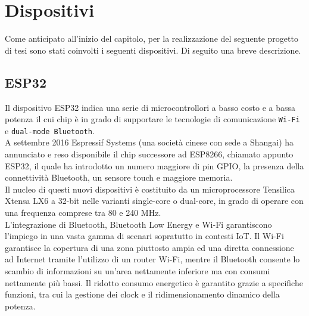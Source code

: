 \section{Dispositivi}
Come anticipato all'inizio del capitolo, per la realizzazione del seguente progetto di tesi sono stati coinvolti i seguenti dispositivi. Di seguito una breve descrizione.
\subsection{ESP32}
Il dispositivo ESP32 indica una serie di microcontrollori a basso costo e a bassa potenza il cui chip è in grado di supportare le tecnologie di comunicazione \texttt{Wi-Fi} e \texttt{dual-mode Bluetooth}. \\
A settembre 2016 Espressif Systems (una società cinese con sede a Shangai) ha annunciato e reso disponibile il chip successore ad ESP8266, chiamato appunto ESP32, il quale ha introdotto un numero maggiore di pin GPIO, la presenza della connettività Bluetooth, un sensore touch e maggiore memoria.\\ 
Il nucleo di questi nuovi dispositivi è costituito da un microprocessore Tensilica Xtensa LX6 a 32-bit nelle varianti single-core o dual-core, in grado di operare con una frequenza comprese tra 80 e 240 MHz.\\
L'integrazione di Bluetooth, Bluetooth Low Energy e Wi-Fi garantiscono  l'impiego in una vasta gamma di scenari sopratutto in contesti IoT. Il Wi-Fi garantisce la copertura di una zona piuttosto ampia ed una diretta connessione ad Internet tramite l'utilizzo di un router Wi-Fi, mentre il Bluetooth consente lo scambio di informazioni su un'area nettamente inferiore ma con consumi nettamente più bassi. 
Il ridotto consumo energetico è garantito grazie a specifiche funzioni, tra cui la gestione dei clock e il ridimensionamento dinamico della potenza.\\

